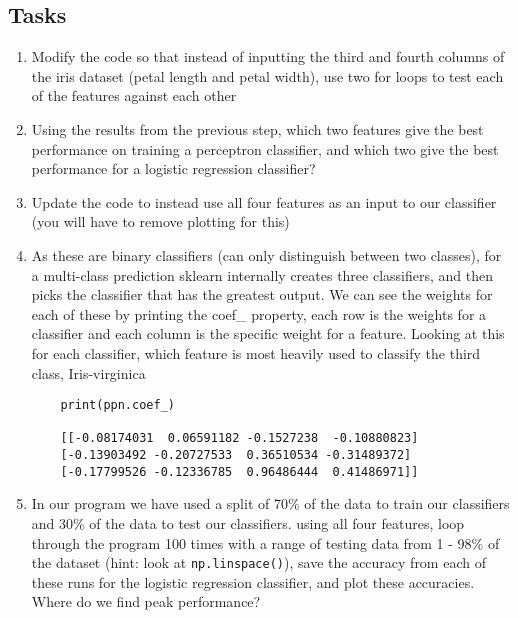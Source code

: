 \documentclass[12pt]{article}
\def\code#1{\texttt{#1}} %
\begin{document}
\subsection{Tasks}
\begin{enumerate}
\item Modify the code so that instead of inputting the third and fourth columns of the iris dataset (petal length and petal width), use two for loops to test each of the features against each other 



\item Using the results from the previous step, which two features give the best performance on training a perceptron classifier, and which two give the best performance for a logistic regression classifier?

\item Update the code to instead use all four features as an input to our classifier (you will have to remove plotting for this)

\item As these are binary classifiers (can only distinguish between two classes), for a multi-class prediction sklearn internally creates three classifiers, and then picks the classifier that has the greatest output. We can see the weights for each of these by printing the coef\_ property, each row is the weights for a classifier and each column is the specific weight for a feature. Looking at this for each classifier, which feature is most heavily used to classify the third class, Iris-virginica
\begin{verbatim}
    print(ppn.coef_)

    [[-0.08174031  0.06591182 -0.1527238  -0.10880823]
    [-0.13903492 -0.20727533  0.36510534 -0.31489372]
    [-0.17799526 -0.12336785  0.96486444  0.41486971]]
\end{verbatim}


\item In our program we have used a split of 70\% of the data to train our classifiers and 30\% of the data to test our classifiers. using all four features, loop through the program 100 times with a range of testing data from 1 - 98\% of the dataset (hint: look at \code{np.linspace()}), save the accuracy from each of these runs for the logistic regression classifier, and plot these accuracies. Where do we find peak performance?


\end{enumerate}
\end{document}
